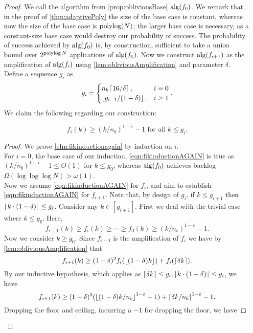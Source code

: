 \begin{proof}
  We call the algorithm from \cref{prop:obliviousBase}
  $\operatorname{\text{\textup{alg}}}(f_0)$. We remark that in the proof of
  \cref{thm:adaptivePoly} the size of the base case is constant,
  whereas now the size of the base case is $\operatorname{\textnormal{polylog}}(N)$; the
  larger base case is necessary, as a constant-size base case
  would destroy our probability of success. The probability of
  success achieved by $\operatorname{\text{\textup{alg}}}(f_0)$ is, by construction, sufficient
  to take a union bound over $2^{\operatorname{\textnormal{polylog}} N}$ applications of
  $\operatorname{\text{\textup{alg}}}(f_0)$. Now we construct $\operatorname{\text{\textup{alg}}}(f_{i+1})$ as the amplification
  of $\operatorname{\text{\textup{alg}}}(f_i)$ using \cref{lem:obliviousAmplification} and
  parameter $\delta$. Define a sequence $g_i$ as 
  $$g_i =
  \begin{cases}
    n_b\left\lceil 16/\delta \right\rceil, & i=0\\
    \left\lfloor  g_{i-1}/(1-\delta)  \right\rfloor, & i\ge 1 
  \end{cases}.$$
  We claim the following regarding our construction:
  \begin{clm}
    \label{clm:fikinductionagain}
    \begin{equation}
      f_i(k) \ge (k/n_b)^{1-\varepsilon} - 1 \text{ for all } k \le g_i. \label{eqn:fikinductionAGAIN}
    \end{equation}
  \end{clm}
  \begin{proof}
  We prove \cref{clm:fikinductionagain} by induction on $i$. \\
  For $i=0$, the base case of our induction,
  \eqref{eqn:fikinductionAGAIN} is true as
  $(k/n_b)^{1-\epsilon} - 1 \le O(1)$ for $k\le g_0$, whereas
  $\operatorname{\text{\textup{alg}}}(f_0)$ achieves backlog $\Omega(\log\log\log N) >
  \omega(1)$.\\
  Now we assume \eqref{eqn:fikinductionAGAIN} for $f_i$, and aim to
  establish \eqref{eqn:fikinductionAGAIN} for $f_{i+1}$. 
  Note that, by design of $g_i$, if $k \le g_{i+1}$ then
  $\left\lfloor k\cdot (1-\delta) \right\rfloor \le g_i$. Consider any $k\in
  [g_{i+1}]$. 
  First we deal with the trivial case where $k \le g_0$. Here, 
  $$f_{i+1}(k) \ge f_i(k) \ge \cdots \ge f_0(k) \ge (k/n_b)^{1-\varepsilon} -1.$$
  Now we consider $k \ge g_0$. 
  Since $f_{i+1}$ is the amplification of $f_i$ we have by \cref{lem:obliviousAmplification} that
  $$f_{i+1}(k) \ge (1-\delta)^2 f_i(\left\lfloor (1-\delta)k \right\rfloor) + f_i(\left\lceil \delta k \right\rceil).$$
  By our inductive hypothesis, which applies as $\left\lceil \delta k \right\rceil\le g_i, \left\lfloor k\cdot (1-\delta) \right\rfloor \le g_i$, we have
  $$f_{i+1}(k) \ge (1-\delta)^2 (\left\lfloor (1-\delta)k/n_b \right\rfloor^{1-\varepsilon}-1) + \left\lceil \delta k/n_b \right\rceil^{1-\varepsilon} - 1. $$
  Dropping the floor and ceiling, incurring a $-1$ for dropping the floor, we have

\end{proof}
\end{proof}
